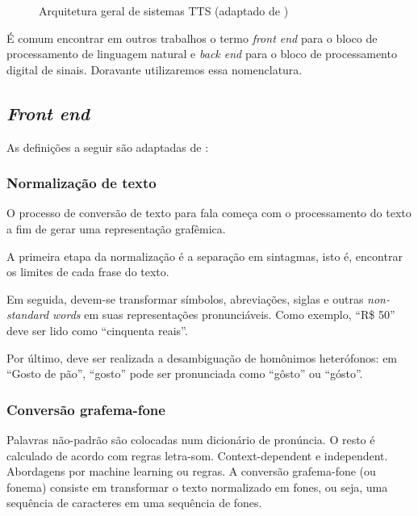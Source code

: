 \begin{figure}[!htbp]
\centering
{}
\caption{Arquitetura geral de sistemas TTS (adaptado de )}
\label{fig:tts-arch}
\end{figure}
É comum encontrar em outros trabalhos o termo \emph{front end} para o
bloco de processamento de linguagem natural e \emph{back end} para o bloco de
processamento digital de sinais. Doravante utilizaremos essa nomenclatura.

\subsection{\emph{Front end}}
As definições a seguir são adaptadas de \cite{martinjurafsky}:

\subsubsection{Normalização de texto}
O processo de conversão de texto para fala começa com o processamento do texto a
fim de gerar uma representação grafêmica.

A primeira etapa da normalização é a separação em sintagmas, isto é, encontrar os
limites de cada frase do texto. 

Em seguida, devem-se transformar símbolos, abreviações, siglas e outras
\emph{non-standard words} em suas representações pronunciáveis. Como exemplo, ``R\$
50'' deve ser lido como ``cinquenta reais''.

Por último, deve ser realizada a desambiguação de homônimos heterófonos: em
``Gosto de pão'', ``gosto'' pode ser pronunciada como ``gôsto'' ou ``gósto''.

\subsubsection{Conversão grafema-fone}
Palavras não-padrão são colocadas num dicionário de pronúncia. O resto é
calculado de acordo com regras letra-som.
Context-dependent e independent. Abordagens por machine learning ou regras.
A conversão grafema-fone (ou fonema) consiste em transformar o texto normalizado
em fones, ou seja, uma sequência de caracteres em uma sequência de fones.

